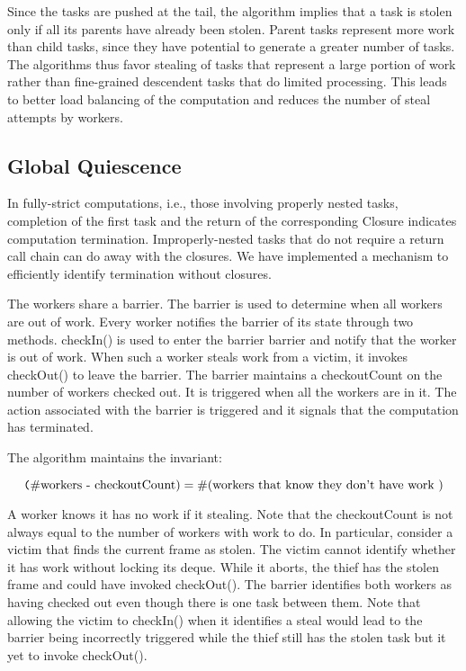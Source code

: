 Since the tasks are pushed at the tail, the algorithm implies that a
task is stolen only if all its parents have already been
stolen. Parent tasks represent more work than child tasks, since they
have potential to generate a greater number of tasks. The algorithms
thus favor stealing of tasks that represent a large portion of work
rather than fine-grained descendent tasks that do limited
processing. This leads to better load balancing of the computation and
reduces the number of steal attempts by workers.



\subsection{Global Quiescence}

In fully-strict computations, i.e., those involving properly nested
tasks, completion of the first task and the return of the
corresponding Closure indicates computation termination.
Improperly-nested tasks that do not require a return call chain can do
away with the closures. We have implemented a mechanism to efficiently
identify termination without closures.

The workers share a barrier. The barrier is used to determine when all
workers are out of work. Every worker notifies the barrier of its
state through two methods. {\java checkIn()} is used to enter the
barrier barrier and notify that the worker is out of work. When such a
worker steals work from a victim, it invokes {\java checkOut()} to
leave the barrier. The barrier maintains a {\java checkoutCount} on
the number of workers checked out. It is triggered when all the workers
are in it. The action associated with the barrier is triggered and it
signals that the computation has terminated.

The algorithm maintains the invariant:

\[
\mbox{{\texttt (\#workers - checkoutCount)}} = \mbox{\#(workers that know they don't
  have work )}
\]

A worker knows it has no work if it stealing. Note that the
checkoutCount is not always equal to the number of workers with work
to do. In particular, consider a victim that finds the current frame
as stolen. The victim cannot identify whether it has work without
locking its deque. While it aborts, the thief has the stolen
frame and could have invoked {\java checkOut()}. The barrier
identifies both workers as having checked out even though there is one
task between them. Note that allowing the victim to {\java
  checkIn()} when it identifies a steal would lead to the barrier
being incorrectly triggered while the thief still has the stolen task
but it yet to invoke {\java checkOut()}.


